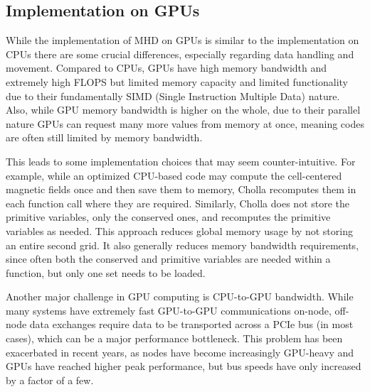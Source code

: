 \documentclass[modern, linenumbers]{aastex631}
\begin{document}
\subsection{Implementation on GPUs}
\label{sec:gpu-vs-cpu}

While the implementation of MHD on GPUs is similar to the implementation on CPUs there are some crucial differences, especially regarding data handling and movement. Compared to CPUs, GPUs have high memory bandwidth and extremely high FLOPS but limited memory capacity and limited functionality due to their fundamentally SIMD (Single Instruction Multiple Data) nature. Also, while GPU memory bandwidth is higher on the whole, due to their parallel nature GPUs can request many more values from memory at once, meaning codes are often still limited by memory bandwidth.

This leads to some implementation choices that may seem counter-intuitive. For example, while an optimized CPU-based code may compute the cell-centered magnetic fields once and then save them to memory, Cholla recomputes them in each function call where they are required. Similarly, Cholla does not store the primitive variables, only the conserved ones, and recomputes the primitive variables as needed. This approach reduces global memory usage by not storing an entire second grid. It also generally reduces memory bandwidth requirements, since often both the conserved and primitive variables are needed within a function, but only one set needs to be loaded.

Another major challenge in GPU computing is CPU-to-GPU bandwidth. While many systems have extremely fast GPU-to-GPU communications on-node, off-node data exchanges require data to be transported across a PCIe bus (in most cases), which can be a major performance bottleneck. This problem has been exacerbated in recent years, as nodes have become increasingly GPU-heavy and GPUs have reached higher peak performance, but bus speeds have only increased by a factor of a few.
\end{document}

